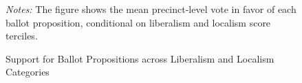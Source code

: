 \documentclass[article,11pt]{memoir}
\begin{document}
\begin{figure}[p]\centering
  \caption{Support for Ballot Propositions across Liberalism and Localism Categories}
  \label{fig:g_pc}
  \begin{measuredfigure}
  \end{measuredfigure}
  \begin{tablenotes}[flushleft]
    \item \hspace{-.2em}\emph{Notes:} The figure shows the mean precinct-level vote in favor of each ballot proposition, conditional on liberalism and localism score terciles.
  \end{tablenotes}
\end{figure}
\end{document}
